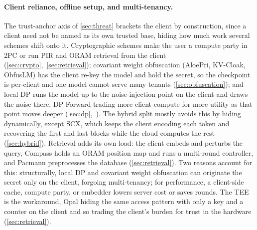 \paragraph{Client reliance, offline setup, and multi-tenancy.}
The trust-anchor axis of \cref{sec:threat} brackets the client by construction, since a client
need not be named as its own trusted base, hiding how much work several schemes shift onto it.
Cryptographic schemes make the user a compute party in 2PC or run PIR and ORAM retrieval from the
client (\cref{sec:crypto},~\cref{sec:retrieval}); covariant weight obfuscation (AloePri, KV-Cloak,
ObfusLM) has the client re-key the model and hold the secret, so the checkpoint is per-client and
one model cannot serve many tenants (\cref{sec:obfuscation}); and local DP runs the model up to
the noise-injection point on the client and draws the noise there, DP-Forward trading more client
compute for more utility as that point moves deeper (\cref{sec:dp},~\citealp{du_dpforward}). The
hybrid split mostly avoids this by hiding dynamically, except SCX, which keeps the client encoding
each token and recovering the first and last blocks while the cloud computes the rest
(\cref{sec:hybrid}). Retrieval adds its own load: the client embeds and perturbs the query,
Compass holds an ORAM position map and runs a multi-round controller, and Pacmann preprocesses the
database (\cref{sec:retrieval}). Two reasons account for this: structurally, local DP and
covariant weight obfuscation can originate the secret only on the client, forgoing multi-tenancy;
for performance, a client-side cache, compute party, or embedder lowers server cost or saves
rounds. The TEE is the workaround, Opal hiding the same access pattern with only a key and a
counter on the client and so trading the client's burden for trust in the hardware
(\cref{sec:retrieval}).

